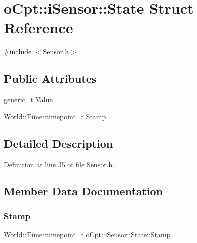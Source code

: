 \hypertarget{structo_cpt_1_1i_sensor_1_1_state}{}\section{o\+Cpt\+:\+:i\+Sensor\+:\+:State Struct Reference}
\label{structo_cpt_1_1i_sensor_1_1_state}


{\ttfamily \#include $<$Sensor.\+h$>$}

\subsection*{Public Attributes}
\begin{DoxyCompactItemize}
\item 
\hyperlink{classo_cpt_1_1i_sensor_a8c83eafe5bdc0074a8c2c405023ee204}{generic\+\_\+t} \hyperlink{structo_cpt_1_1i_sensor_1_1_state_ad3994c60f8e89120291699653d5c3498}{Value}
\item 
\hyperlink{classo_cpt_1_1_world_1_1_time_a6a6e782c3c90622c1c7070b0a223ec4c}{World\+::\+Time\+::timepoint\+\_\+t} \hyperlink{structo_cpt_1_1i_sensor_1_1_state_ac1cdd4f70232e17b55de7b76ef5382f4}{Stamp}
\end{DoxyCompactItemize}


\subsection{Detailed Description}


Definition at line 35 of file Sensor.\+h.



\subsection{Member Data Documentation}
\hypertarget{structo_cpt_1_1i_sensor_1_1_state_ac1cdd4f70232e17b55de7b76ef5382f4}{}\label{structo_cpt_1_1i_sensor_1_1_state_ac1cdd4f70232e17b55de7b76ef5382f4} 
\subsubsection{\texorpdfstring{Stamp}{Stamp}}
{\footnotesize\ttfamily \hyperlink{classo_cpt_1_1_world_1_1_time_a6a6e782c3c90622c1c7070b0a223ec4c}{World\+::\+Time\+::timepoint\+\_\+t} o\+Cpt\+::i\+Sensor\+::\+State\+::\+Stamp}



